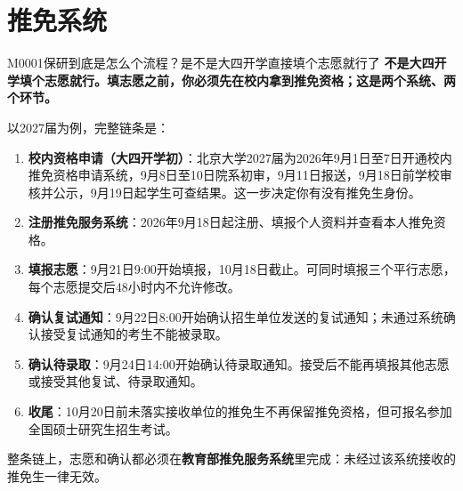 \section{推免系统}
\begin{qa}{M0001}{保研到底是怎么个流程？是不是大四开学直接填个志愿就行了}
\textbf{不是大四开学填个志愿就行。填志愿之前，你必须先在校内拿到推免资格；这是两个系统、两个环节。}

以2027届为例，完整链条是：

\begin{enumerate}
  \item \textbf{校内资格申请（大四开学初）}：北京大学2027届为2026年9月1日至7日开通校内推免资格申请系统，9月8日至10日院系初审，9月11日报送，9月18日前学校审核并公示，9月19日起学生可查结果。这一步决定你有没有推免生身份。
  \item \textbf{注册推免服务系统}：2026年9月18日起注册、填报个人资料并查看本人推免资格。
  \item \textbf{填报志愿}：9月21日9:00开始填报，10月18日截止。可同时填报三个平行志愿，每个志愿提交后48小时内不允许修改。
  \item \textbf{确认复试通知}：9月22日8:00开始确认招生单位发送的复试通知；未通过系统确认接受复试通知的考生不能被录取。
  \item \textbf{确认待录取}：9月24日14:00开始确认待录取通知。接受后不能再填报其他志愿或接受其他复试、待录取通知。
  \item \textbf{收尾}：10月20日前未落实接收单位的推免生不再保留推免资格，但可报名参加全国硕士研究生招生考试。
\end{enumerate}

整条链上，志愿和确认都必须在\textbf{教育部推免服务系统}里完成：未经过该系统接收的推免生一律无效。
\end{qa}

